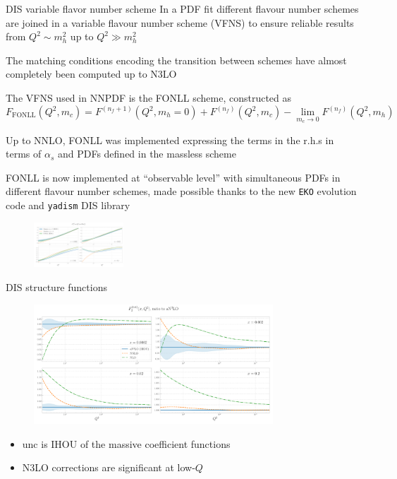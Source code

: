 \documentclass[aspectratio=169, 9pt,t]{beamer}
\begin{document}
\begin{frame}{DIS variable flavor number scheme}
  In a PDF fit different flavour number schemes are joined in a variable flavour number scheme (VFNS) to ensure reliable results from $Q^2\sim m_h^2$ up to $Q^2\gg m_h^2$

  The matching conditions encoding the transition between schemes have almost completely been computed up to N3LO

  The VFNS used in NNPDF is the FONLL scheme, constructed as
  $$F_\mathrm{FONLL}(Q^2,m_c)=F^{(n_f+1)}(Q^2,m_h=0)+F^{(n_f)}(Q^2,m_c)-\lim_{m_c\rightarrow 0}F^{(n_f)}(Q^2,m_h)$$

  Up to NNLO, FONLL was implemented expressing the terms in the r.h.s in terms of $\alpha_s$ and PDFs defined in the massless scheme

  FONLL is now implemented at ``observable level'' with simultaneous PDFs in different flavour number schemes, made possible thanks to the new \texttt{EKO} evolution code and \texttt{yadism} DIS library

  \begin{figure}[!t]
    \centering
    \includegraphics[width=0.3\textwidth]{figures/F2_charm_n3lo.pdf}
  \end{figure}

\end{frame}



\begin{frame}{DIS structure functions}
  \begin{figure}[!t]
    \centering
    \includegraphics[width=0.8\textwidth]{figures/F2_total.pdf}
  \end{figure}
  \begin{itemize}
    \item unc is IHOU of the massive coefficient functions
    \item N3LO corrections are significant at low-$Q$
  \end{itemize}
\end{frame}
\end{document}
